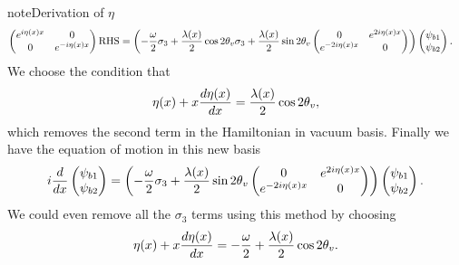 \documentclass[letterpaper,12pt,english]{sphinxmanual}
\begin{document}
\begin{notice}{note}{Derivation of \(\eta\)}
\begin{gather}
\begin{split}
\begin{pmatrix} e^{i\eta(x)x} & 0 \\ 0 & e^{-i \eta(x)x} \end{pmatrix} \mathrm{RHS} & = \left( - \frac{\omega}{2} \sigma_3 + \frac{\lambda(x)}{2} \cos 2\theta_v \sigma_3 + \frac{\lambda(x)}{2} \sin 2\theta_v \begin{pmatrix} 0 & e^{2i\eta(x)x} \\ e^{-2i\eta(x)x} & 0 \end{pmatrix}  \right)  \begin{pmatrix} \psi_{b1} \\ \psi_{b2} \end{pmatrix} .\end{split}\notag
\end{gather}
We choose the condition that
\begin{gather}
\begin{split}\eta(x) + x \frac{d\eta(x)}{dx} = \frac{\lambda(x)}{2} \cos 2\theta_v,\end{split}\notag
\end{gather}
which removes the second term in the Hamiltonian in vacuum basis. Finally we have the equation of motion in this new basis
\begin{gather}
\begin{split}i \frac{d}{dx} \begin{pmatrix} \psi_{b1} \\ \psi_{b2} \end{pmatrix} = \left( - \frac{\omega}{2} \sigma_3 + \frac{\lambda(x)}{2} \sin 2\theta_v \begin{pmatrix} 0 & e^{2i\eta(x)x} \\ e^{-2i\eta(x)x} & 0 \end{pmatrix} \right) \begin{pmatrix} \psi_{b1} \\ \psi_{b2} \end{pmatrix}.\end{split}\notag
\end{gather}
We could even remove all the \(\sigma_3\) terms using this method by choosing
\begin{gather}
\begin{split}\eta(x) + x \frac{d\eta(x)}{dx} = -\frac{\omega}{2} + \frac{\lambda(x)}{2} \cos 2\theta_v.\end{split}\notag
\end{gather}\end{notice}
\end{document}
